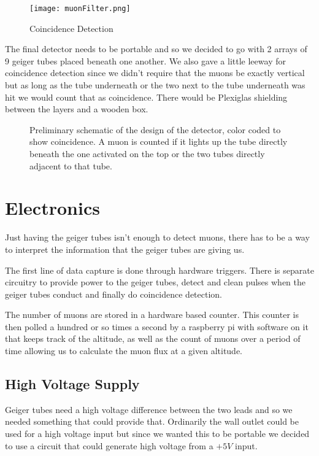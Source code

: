 \documentclass[oneside]{article}
\begin{document}
  \begin{figure}[H]
      \centering
      \texttt{[image: muonFilter.png]}
      \caption{Coincidence Detection}
      \label{muonFilter}
  \end{figure}

  The final detector needs to be portable and so we decided to go with 2 arrays of 9 geiger tubes placed beneath one another. We also gave a little leeway for coincidence detection since we didn't require that the muons be exactly vertical but as long as the tube underneath or the two next to the tube underneath was hit we would count that as coincidence. There would be Plexiglas shielding between the layers and a wooden box.

  \begin{figure}[H]
      \centering
      \def\svgwidth{\linewidth}
      
      \caption{Preliminary schematic of the design of the detector, color coded to show coincidence. A muon is counted if it lights up the tube directly beneath the one activated on the top or the two tubes directly adjacent to that tube.}
      \label{coincidenceDetection}
  \end{figure}

  \section{Electronics}
    Just having the geiger tubes isn't enough to detect muons, there has to be a way to interpret the information that the geiger tubes are giving us.

    The first line of data capture is done through hardware triggers. There is separate circuitry to provide power to the geiger tubes, detect and clean pulses when the geiger tubes conduct and finally do coincidence detection.

    The number of muons are stored in a hardware based counter. This counter is then polled a hundred or so times a second by a raspberry pi with software on it that keeps track of the altitude, as well as the count of muons over a period of time allowing us to calculate the muon flux at a given altitude.

  \subsection{High Voltage Supply}
    Geiger tubes need a high voltage difference between the two leads and so we needed something that could provide that. Ordinarily the wall outlet could be used for a high voltage input but since we wanted this to be portable we decided to use a circuit that could generate high voltage from a $+5V$ input.
\end{document}
